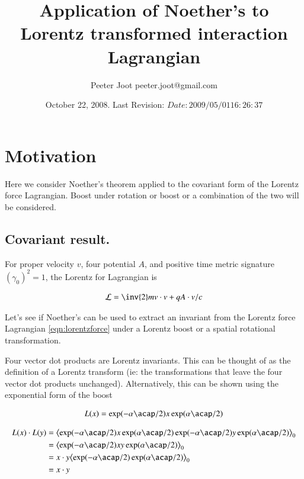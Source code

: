 \documentclass{article}      %
\title{ Application of Noether's to Lorentz transformed interaction Lagrangian } %
\author{Peeter Joot \quad peeter.joot@gmail.com}         %
\date{ October 22, 2008.  Last Revision: $Date: 2009/05/01 16:26:37 $ } %
\begin{document}

\maketitle{}

\tableofcontents

\section{ Motivation }

Here we consider Noether's theorem applied to the covariant form of the Lorentz force Lagrangian.  Boost under rotation or boost or a combination of the two will be considered.

\subsection{ Covariant result. } 

For proper velocity $v$, four potential $A$, and positive time metric signature $(\gamma_0)^2 = 1$, the Lorentz for
Lagrangian is

\begin{align}\label{eqn:lorentzforce}
\LL = \inv{2}m v \cdot v + q A \cdot v/c
\end{align}

Let's see if Noether's can be used to extract an invariant from 
the Lorentz force Lagrangian \ref{eqn:lorentzforce} under a
Lorentz boost or a spatial rotational transformation.

Four vector dot products are Lorentz invariants.  This can be thought of as the definition of a Lorentz transform (ie: the transformations
that leave the four vector dot products unchanged).  Alternatively, this can be shown using the exponential form of the boost

\begin{align*}
L(x) = \exp(-\alpha \acap/2) x \exp(\alpha \acap/2)
\end{align*}

\begin{align*}
L(x) \cdot L(y)
&= \gpgradezero{ \exp(-\alpha \acap/2) x \exp(\alpha \acap/2) \exp(-\alpha \acap/2) y \exp(\alpha \acap/2) } \\
&= \gpgradezero{ \exp(-\alpha \acap/2) x y \exp(\alpha \acap/2) } \\
&= x \cdot y \gpgradezero{ \exp(-\alpha \acap/2) \exp(\alpha \acap/2) } \\
&= x \cdot y \\
\end{align*}
\end{document}
